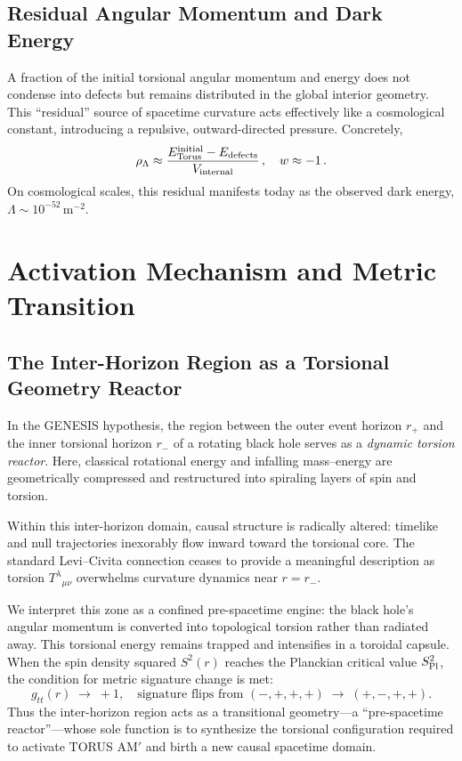 \documentclass{article}
\begin{document}
\subsection{Residual Angular Momentum and Dark Energy}
A fraction of the initial torsional angular momentum and energy does not condense into defects but remains distributed in the global interior geometry. This “residual” source of spacetime curvature acts effectively like a cosmological constant, introducing a repulsive, outward-directed pressure. Concretely,
\[
  \rho_\Lambda 
    \approx \frac{E_{\rm Torus}^{\rm initial} - E_{\rm defects}}
               {V_{\rm internal}}\,, \quad
  w \approx -1\,.
\]
On cosmological scales, this residual manifests today as the observed dark energy,
\(\Lambda \sim 10^{-52}\,\mathrm{m^{-2}}\).

\section{Activation Mechanism and Metric Transition}
\label{sec:activation}

\subsection{The Inter-Horizon Region as a Torsional Geometry Reactor}
In the GENESIS hypothesis, the region between the outer event horizon \(r_+\) and the inner torsional horizon \(r_-\) of a rotating black hole serves as a \emph{dynamic torsion reactor}. Here, classical rotational energy and infalling mass–energy are geometrically compressed and restructured into spiraling layers of spin and torsion.

Within this inter-horizon domain, causal structure is radically altered: timelike and null trajectories inexorably flow inward toward the torsional core. The standard Levi–Civita connection ceases to provide a meaningful description as torsion \(T^\lambda{}_{\mu\nu}\) overwhelms curvature dynamics near \(r = r_-\).

We interpret this zone as a confined pre-spacetime engine: the black hole’s angular momentum is converted into topological torsion rather than radiated away. This torsional energy remains trapped and intensifies in a toroidal capsule. When the spin density squared \(S^2(r)\) reaches the Planckian critical value \(S_{\rm Pl}^2\), the condition for metric signature change is met:
\[
  g_{tt}(r)\;\longrightarrow\;+1,
  \quad
  \text{signature flips from }(-,+,+,+)\;\to\;(+,-,+,+).
\]
Thus the inter-horizon region acts as a transitional geometry—a “pre-spacetime reactor”—whose sole function is to synthesize the torsional configuration required to activate TORUS AM$'$ and birth a new causal spacetime domain.
\end{document}
